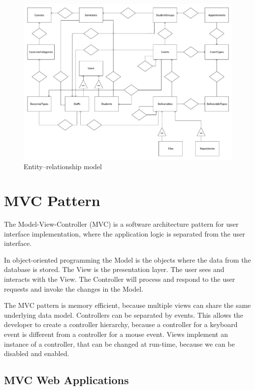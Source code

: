 \begin{figure}[!htbp]
	\includegraphics[width=0.85\textheight, angle=90]{figures/ER.pdf}
	\caption[Entity–relationship model]{Entity–relationship model}
	\label{fig:er}
\end{figure}

\newpage
\section{MVC Pattern}
\label{mvc}

The Model-View-Controller (MVC) is a software architecture pattern for user interface implementation, where the application logic is separated from the user interface.

In object-oriented programming the Model is the objects where the data from the database is stored. The View is the presentation layer. The user sees and interacts with the View. The Controller will process and respond to the user requests and invoke the changes in the Model. 

The MVC pattern is memory efficient, because multiple views can share the same underlying data model. Controllers can be separated by events. This allows the developer to create a controller hierarchy, because a controller for a keyboard event is different from a controller for a mouse event. Views implement an instance of a controller, that can be changed at run-time, because we can be disabled and enabled.

\subsection{MVC Web Applications}


